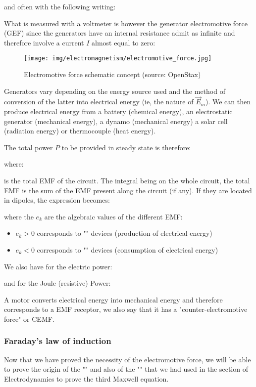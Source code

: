 	and often with the following writing:
	
	What is measured with a voltmeter is however the generator electromotive force (GEF) since the generators have an internal resistance admit as infinite and therefore involve a current $I$ almost equal to zero:
	\begin{figure}[H]
		\centering
		\texttt{[image: img/electromagnetism/electromotive\_force.jpg]}	
		\caption[Electromotive force schematic concept]{Electromotive force schematic concept (source: OpenStax)}
	\end{figure}

	Generators vary depending on the energy source used and the method of conversion of the latter into electrical energy (ie, the nature of $\vec{E}_m$). We can then produce electrical energy from a battery (chemical energy), an electrostatic generator (mechanical energy), a dynamo (mechanical energy) a solar cell (radiation energy) or thermocouple (heat energy).
	
	The total power $P$ to be provided in steady state is therefore:
	
	where:
	
	is the total EMF of the circuit\label{total emf of the circuit}. The integral being on the whole circuit, the total EMF is the sum of the EMF present along the circuit (if any). If they are located in dipoles, the expression becomes:
	
	where the $e_k$ are the algebraic values of the different EMF:
	\begin{itemize}
		\item $e_k>0$ corresponds to "" devices (production of electrical energy)

		\item $e_k<0$ corresponds to "" devices (consumption of electrical energy)
	\end{itemize}
	We also have for the electric power:
	
	and for the Joule (resistive) Power:
	
	A motor converts electrical energy into mechanical energy and therefore corresponds to a EMF receptor, we also say that it has a "counter-electromotive force" or CEMF.
	
	\subsubsection{Faraday's law of induction}
	Now that we have proved the necessity of the electromotive force, we will be able to prove the origin of the "" and also of the "" that we had used in the section of Electrodynamics to prove the third Maxwell equation. 

